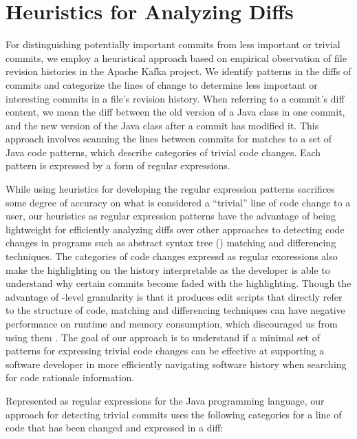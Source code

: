 \section{Heuristics for Analyzing Diffs}
\label{sec:Heuristics}

For distinguishing potentially important commits from less important or trivial commits, we employ a heuristical approach based on empirical observation of file revision histories in the Apache Kafka project.
We identify patterns in the diffs of commits and categorize the lines of change to determine less important or interesting commits in a file's revision history.
When referring to a commit's diff content, we mean the diff between the old version of a Java class in one commit, and the new version of the Java class after a commit has modified it.
This approach involves scanning the lines between commits for matches to a set of Java code patterns, which describe categories of trivial code changes.
Each pattern is expressed by a form of regular expressions.

While using heuristics for developing the regular expression patterns sacrifices some degree of accuracy on what is considered a ``trivial'' line of code change to a user,
our heuristics as regular expression patterns have the advantage of being lightweight for efficiently analyzing diffs over other approaches to detecting code changes in programs such as abstract syntax tree () matching and differencing techniques.
The categories of code changes expressd as regular exoressions also  make the highlighting on the history interpretable as the developer is able to understand why certain commits become faded with the highlighting.
Though the advantage of -level granularity is that it produces edit scripts that directly refer to the structure of code,  matching and differencing techniques can have negative performance on runtime and memory consumption, which discouraged us from using them \cite{fluri_change_2007,pawlik_RTED_2011,falleri_fine-grained_2014}.
The goal of our approach is to understand if a minimal set of patterns for expressing trivial code changes can be effective at supporting a software developer in more efficiently navigating software history when searching for code rationale information.

Represented as regular expressions for the Java programming language, our approach for detecting trivial commits uses the following categories for a line of code that has been changed and expressed in a diff: 

